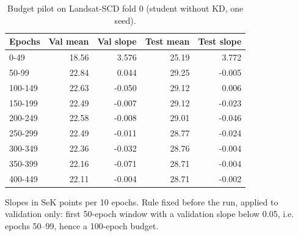 \begin{table}[!t]
\centering
\footnotesize
\caption{Budget pilot on Landsat-SCD fold 0 (student without KD, one seed).}
\label{tab:s-pilot}
\begin{tabular}{lrrrr}
\toprule
Epochs & Val mean & Val slope & Test mean & Test slope \\
\midrule
0-49 & 18.56 & 3.576 & 25.19 & 3.772 \\
50-99 & 22.84 & 0.044 & 29.25 & -0.005 \\
100-149 & 22.63 & -0.050 & 29.12 & 0.006 \\
150-199 & 22.49 & -0.007 & 29.12 & -0.023 \\
200-249 & 22.58 & -0.008 & 29.01 & -0.046 \\
250-299 & 22.49 & -0.011 & 28.77 & -0.024 \\
300-349 & 22.36 & -0.032 & 28.76 & -0.004 \\
350-399 & 22.16 & -0.071 & 28.71 & -0.004 \\
400-449 & 22.11 & -0.004 & 28.71 & -0.002 \\
\bottomrule
\end{tabular}
\par\smallskip\parbox{\linewidth}{\scriptsize Slopes in SeK points per 10 epochs. Rule fixed before the run, applied to validation only: first 50-epoch window with a validation slope below 0.05, i.e. epochs 50--99, hence a 100-epoch budget.}
\end{table}
